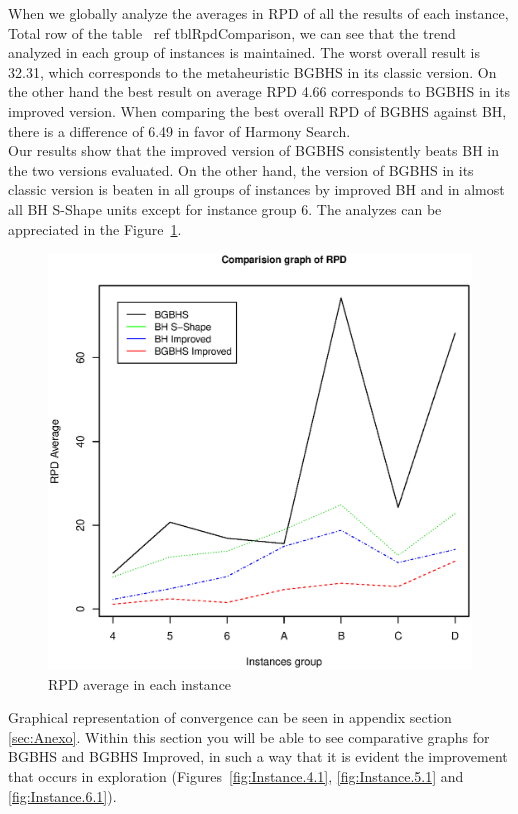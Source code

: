 When we globally analyze the averages in RPD of all the results of each instance, Total row of the table \ ref {tblRpdComparison}, we can see that the trend analyzed in each group of instances is maintained.
The worst overall result is 32.31, which corresponds to the metaheuristic BGBHS in its classic version. On the other hand the best result on average RPD 4.66 corresponds to BGBHS in its improved version. When comparing the best overall RPD of BGBHS against BH, there is a difference of 6.49 in favor of Harmony Search.\\

Our results show that the improved version of BGBHS consistently beats BH in the two versions evaluated. On the other hand, the version of BGBHS in its classic version is beaten in all groups of instances by improved BH and in almost all BH S-Shape units except for instance group 6. The analyzes can be appreciated in the Figure~\ref{fig:RPDAverage}.\\

\begin{figure}[H]
\centering
\includegraphics[scale=.55]{Conclusion/comparisionGraph.eps}
\caption{RPD average in each instance}
\label{fig:RPDAverage}
\end{figure}

Graphical representation of convergence can be seen in appendix section \ref{sec:Anexo}. Within this section you will be able to see comparative graphs for BGBHS and BGBHS Improved, in such a way that it is evident the improvement that occurs in exploration (Figures~\ref{fig:Instance.4.1}, \ref{fig:Instance.5.1} and \ref{fig:Instance.6.1}).

